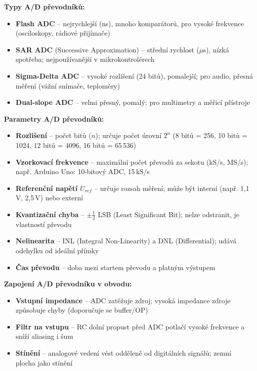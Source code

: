 \documentclass[a4paper,10pt]{article}
\begin{document}
\begin{vysvetlenibox}
\textbf{Typy A/D převodníků:}
\begin{itemize}[noitemsep, leftmargin=1.4em, topsep=4pt]
    \item \textbf{Flash ADC} -- nejrychlejší (ns), mnoho komparátorů,
          pro vysoké frekvence (osciloskopy, rádiové přijímače)
    \item \textbf{SAR ADC} (Successive Approximation) -- střední rychlost ($\mu$s),
          nízká spotřeba; nejpoužívanější v mikrokontrolérech
    \item \textbf{Sigma-Delta ADC} -- vysoké rozlišení (24 bitů), pomalejší;
          pro audio, přesná měření (vážní snímače, teploměry)
    \item \textbf{Dual-slope ADC} -- velmi přesný, pomalý;
          pro multimetry a měřicí přístroje
\end{itemize}

\textbf{Parametry A/D převodníků:}
\begin{itemize}[noitemsep, leftmargin=1.4em, topsep=4pt]
    \item \textbf{Rozlišení} -- počet bitů ($n$); určuje počet úrovní $2^n$
          (8 bitů = 256, 10 bitů = 1024, 12 bitů = 4096, 16 bitů = 65\,536)
    \item \textbf{Vzorkovací frekvence} -- maximální počet převodů za sekotu
          (kS/s, MS/s); např. Arduino Uno: 10-bitový ADC, 15\,kS/s
    \item \textbf{Referenční napětí $U_{ref}$} -- určuje rozsah měření;
          může být interní (např. 1,1\,V, 2,5\,V) nebo externí
    \item \textbf{Kvantizační chyba} -- $\pm \frac{1}{2}$ LSB (Least Significant Bit);
          nelze odstranit, je vlastností převodu
    \item \textbf{Nelinearita} -- INL (Integral Non-Linearity) a DNL (Differential);
          udává odchylku od ideální přímky
    \item \textbf{Čas převodu} -- doba mezi startem převodu a platným výstupem
\end{itemize}

\textbf{Zapojení A/D převodníku v obvodu:}
\begin{itemize}[noitemsep, leftmargin=1.4em, topsep=4pt]
    \item \textbf{Vstupní impedance} -- ADC zatěžuje zdroj; vysoká impedance zdroje
          způsobuje chyby (doporučuje se buffer/OP)
    \item \textbf{Filtr na vstupu} -- RC dolní propust před ADC potlačí vysoké frekvence
          a sníží aliasing i šum
    \item \textbf{Stínění} -- analogové vedení vést odděleně od digitálních signálů;
          zemní plocha jako stínění
\end{itemize}


\end{vysvetlenibox}
\end{document}
